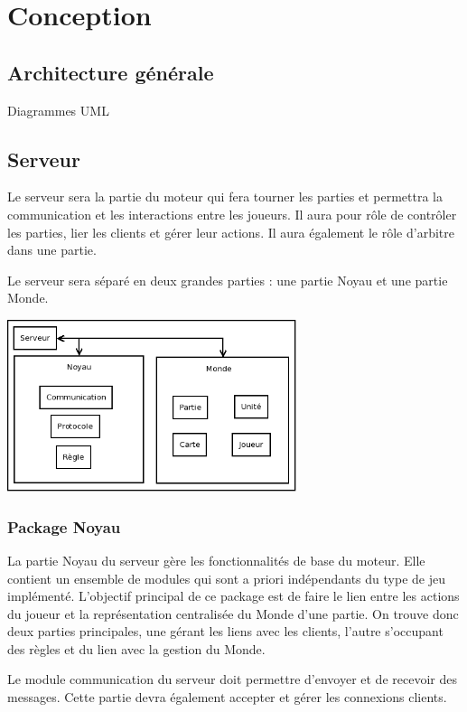 \documentclass[a4paper,10pt]{report}
\begin{document}
  \chapter{Conception}

    \section{Architecture générale}

      Diagrammes UML


    \section{Serveur}

      Le serveur sera la partie du moteur qui fera tourner les parties et permettra la communication et les interactions entre les joueurs. Il aura pour rôle de contrôler les parties, lier les clients et gérer leur actions. Il aura également le rôle d'arbitre dans une partie. 

      Le serveur sera séparé en deux grandes parties : une partie Noyau et une partie Monde.

      \includegraphics[width=320px]{img/server-organisation.png}

      \subsection{Package Noyau}

        La partie Noyau du serveur gère les fonctionnalités de base du moteur. Elle contient un ensemble de modules qui sont a priori indépendants du type de jeu implémenté. L'objectif principal de ce package est de faire le lien entre les actions du joueur et la représentation centralisée du Monde d'une partie. On trouve donc deux parties principales, une gérant les liens avec les clients, l'autre s'occupant des règles et du lien avec la gestion du Monde. 

        Le module communication du serveur doit permettre d'envoyer et de recevoir des messages. Cette partie devra également accepter et gérer les connexions clients.
\end{document}

